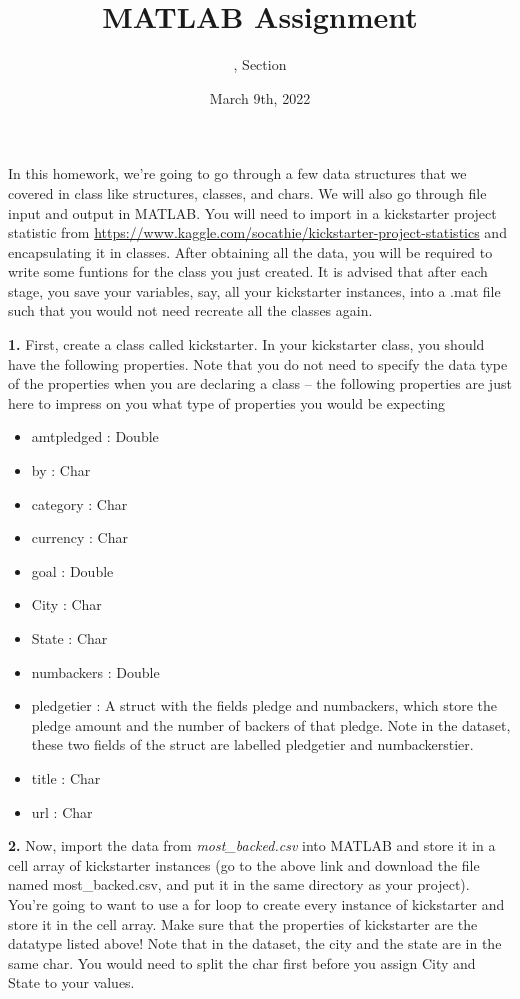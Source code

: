 \documentclass[11pt]{article}
\title{MATLAB Assignment \Homework}
\author{\Session, Section \Section}
\date{March 9th, 2022}
\begin{document}
\maketitle
    
    \noindent
 In this homework, we're going to go through a few data structures that we covered in class like structures, classes, and chars. We will also go through file input and output in MATLAB. You will need to import in a kickstarter project statistic from \url{https://www.kaggle.com/socathie/kickstarter-project-statistics} and encapsulating it in classes. After obtaining all the data, you will be required to write some funtions for the class you just created. It is advised that after each stage, you save your variables, say, all your kickstarter instances, into a .mat file such that you would not need recreate all the classes again.
 
 \bigskip
 \noindent \textbf{1.} First, create a class called kickstarter. In your kickstarter class, you should have the following properties. Note that you do not need to specify the data type of the properties when you are declaring a class – the following properties are just here to impress on you what type of properties you would be expecting
 \begin{itemize}
    \item amtpledged : Double
    \item by : Char
    \item category : Char
    \item currency : Char
    \item goal : Double
    \item City : Char
    \item State : Char
    \item numbackers : Double
    \item pledgetier : A struct with the fields pledge and numbackers, which store the pledge amount and the number of backers of that pledge. Note in the dataset, these two fields of the struct are labelled pledgetier and numbackerstier. 
    \item title : Char
    \item url : Char
 \end{itemize}
 
 
 \bigskip
 \noindent \textbf{2.} Now, import the data from \emph{most\_backed.csv} into MATLAB and store it in a cell array of kickstarter instances (go to the above link and download the file named most\_backed.csv, and put it in the same directory as your project). You're going to want to use a for loop to create every instance of kickstarter and store it in the cell array. Make sure that the properties of kickstarter are the datatype listed above! Note that in the dataset, the city and the state are in the same char. You would need to split the char first before you assign City and State to your values.
 
\end{document}
